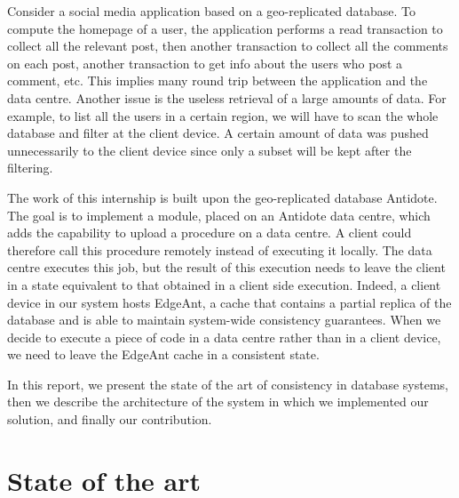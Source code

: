 \documentclass[11pt]{article}
\begin{document}
Consider a social media application based on a geo-replicated database. To
compute the homepage of a user, the application performs a read transaction to
collect all the relevant post, then another transaction to collect all the
comments on each post, another transaction to get info about the users who
post a comment, etc. This implies many round trip between the application and
the data centre. Another issue is the useless retrieval of a large amounts of
data. For example, to list all the users in a certain region, we will have to
scan the whole database and filter at the client device. A certain amount of
data was pushed unnecessarily to the client device since only a subset will be
kept after the filtering.  

The work of this internship is built upon the geo-replicated database
Antidote. 
%
%
The goal is to implement a module, placed on an Antidote data centre, which
adds the capability to upload a procedure on a data centre. A client could
therefore call this procedure remotely instead of executing it locally. The
data centre executes this job, but the result of this execution needs to leave
the client in a state equivalent to that obtained in a client side execution.
Indeed, a client device in our system hosts EdgeAnt, a cache that contains a
partial replica of the database and is able to maintain system-wide
consistency guarantees. When we decide to execute a piece of code in a data
centre rather than in a client device, we need to leave the EdgeAnt cache in a
consistent state.

In this report, we present the state of the art of consistency in database
systems, then we describe the architecture of the system in which we
implemented our solution, and finally our contribution.

\section{State of the art}
\end{document}

